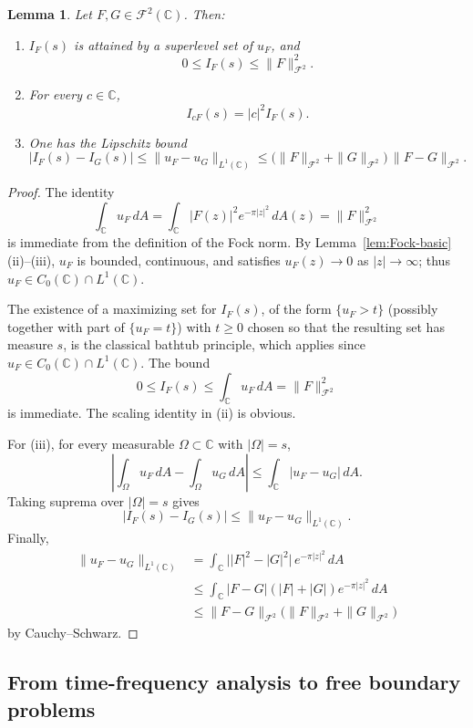 \documentclass[a4paper,11pt,reqno]{amsart}
\numberwithin{equation}{section}
\theoremstyle{plain} %
\newtheorem{lemma}{Lemma}[section]
\theoremstyle{definition} %
\theoremstyle{remark}
\newcommand{\C}{\mathbb{C}}
\begin{document}
\begin{lemma}\label{lem:basic-properties-global}
Let \(F,G\in \mathcal F^2(\C)\). Then:
\begin{enumerate}
    \item[(i)] \(I_F(s)\) is attained by a superlevel set of \(u_F\), and
    \[
    0\le I_F(s)\le \|F\|_{\mathcal F^2}^2.
    \]
    \item[(ii)] For every \(c\in \C\),
    \[
    I_{cF}(s)=|c|^2 I_F(s).
    \]
    \item[(iii)] One has the Lipschitz bound
    \[
    |I_F(s)-I_G(s)|
    \le
    \|u_F-u_G\|_{L^1(\C)}
    \le
    \big(\|F\|_{\mathcal F^2}+\|G\|_{\mathcal F^2}\big)\,
    \|F-G\|_{\mathcal F^2}.
    \]
\end{enumerate}
\end{lemma}

\begin{proof}
The identity
\[
\int_\C u_F\,dA=\int_\C |F(z)|^2e^{-\pi |z|^2}\,dA(z)=\|F\|_{\mathcal F^2}^2
\]
is immediate from the definition of the Fock norm. By
Lemma~\ref{lem:Fock-basic}(ii)--(iii), \(u_F\) is bounded, continuous, and
satisfies \(u_F(z)\to 0\) as \(|z|\to\infty\); thus
\(u_F\in C_0(\C)\cap L^1(\C)\).

The existence of a maximizing set for \(I_F(s)\), of the form
\(\{u_F>t\}\) (possibly together with part of \(\{u_F=t\}\)) with \(t\geq 0\)
chosen so that the resulting set has measure \(s\), is the classical bathtub
principle, which applies since \(u_F\in C_0(\C)\cap L^1(\C)\). The bound
\[
0\le I_F(s)\le \int_\C u_F\,dA=\|F\|_{\mathcal F^2}^2
\]
is immediate. The scaling identity in (ii) is obvious.

For (iii), for every measurable \(\Omega\subset \C\) with \(|\Omega|=s\),
\[
\left|\int_\Omega u_F\,dA-\int_\Omega u_G\,dA\right|
\le \int_\C |u_F-u_G|\,dA.
\]
Taking suprema over \(|\Omega|=s\) gives
\[
|I_F(s)-I_G(s)|\le \|u_F-u_G\|_{L^1(\C)}.
\]
Finally,
\begin{align*}
\|u_F-u_G\|_{L^1(\C)}
&=
\int_\C \big||F|^2-|G|^2\big|\,e^{-\pi |z|^2}\,dA \\
&\le
\int_\C |F-G|(|F|+|G|)e^{-\pi |z|^2}\,dA \\
&\le
\|F-G\|_{\mathcal F^2}\big(\|F\|_{\mathcal F^2}+\|G\|_{\mathcal F^2}\big)
\end{align*}
by Cauchy--Schwarz.
\end{proof}


\subsection{From time-frequency analysis to free boundary problems}\label{sec:fourier-to-fboundary}
\end{document}

